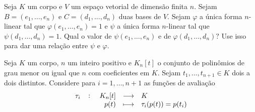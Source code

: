 \documentclass[11pt,a4paper]{article}
\begin{document}
 Seja $K$ um corpo e $V$ um espaço vetorial de dimensão finita $n.$ Sejam $B = (e_1,\ldots ,e_n)$ e $C = (d_1, \ldots , d_n)$ duas bases de $V.$ Sejam $\varphi$ a única forma $n$-linear tal que $\varphi(e_1, \ldots ,e_n) = 1$ e $\psi$ a única forma $n$-linear tal que $\psi(d_1, \ldots, d_n) = 1.$ Qual o valor de $\psi(e_1, \ldots ,e_n)$ e de $\varphi(d_1, \ldots, d_n)?$ Use isso para dar uma relação entre $\psi$ e $\varphi.$

 Seja $K$ um corpo, $n$ um inteiro positivo e $K_n[t]$ o conjunto de polinômios de grau menor ou igual que $n$ com coeficientes em $K.$ Sejam $t_1,  \ldots, t_{n+1} \in K$ dois a dois distintos. Considere para $i = 1, \ldots, n+1$ as funções de avaliação
\[\fullfunction{\tau_i}{K_n[t]}{K}{p(t)}{\tau_i(p(t)) = p(t_i)}\]
\end{document}
